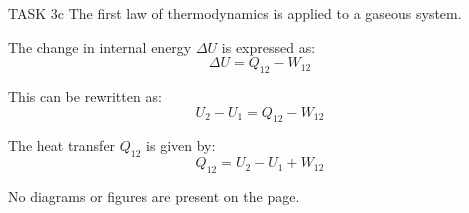 TASK 3c  
The first law of thermodynamics is applied to a gaseous system.  

The change in internal energy \( \Delta U \) is expressed as:  
\[
\Delta U = Q_{12} - W_{12}
\]  

This can be rewritten as:  
\[
U_2 - U_1 = Q_{12} - W_{12}
\]  

The heat transfer \( Q_{12} \) is given by:  
\[
Q_{12} = U_2 - U_1 + W_{12}
\]  

No diagrams or figures are present on the page.